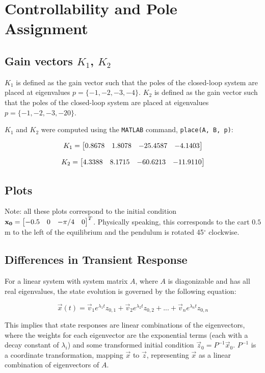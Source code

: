 \documentclass[10pt]{article}
\begin{document}
\section{Controllability and Pole Assignment}

\subsection{Gain vectors \texorpdfstring{$K_1$}{K1}, \texorpdfstring{$K_2$}{K2}}
$K_1$ is defined as the gain vector such that the poles of the closed-loop system are placed at eigenvalues $p =\{-1, -2, -3, -4\}$. $K_2$ is defined as the gain vector such that the poles of the closed-loop system are placed at eigenvalues $p =\{-1, -2, -3, -20\}$.

$K_1$ and $K_2$ were computed using the \texttt{MATLAB} command, \texttt{place(A, B, p)}:

\begin{equation*}
    K_1 = \begin{bmatrix} 0.8678 & 1.8078 & -25.4587 & -4.1403 \end{bmatrix}
\end{equation*}

\begin{equation*}
    K_2 = \begin{bmatrix} 4.3388  &  8.1715 & -60.6213 & -11.9110 \end{bmatrix}
\end{equation*}

\subsection{Plots}
Note: all these plots correspond to the initial condition $\mathbf{x_0} = \begin{bmatrix}  -0.5 & 0 & -\pi/4 & 0 \end{bmatrix}^T$. Physically speaking, this corresponds to the cart $0.5$m to the left of the equilibrium and the pendulum is rotated 45$^\circ$ clockwise.  

\subsection{Differences in Transient Response}
For a linear system with system matrix $A$, where $A$ is diagonizable and has all real eigenvalues, the state evolution is governed by the following equation:

\begin{equation} \label{eqn_state_evolution}
    \vec{x}(t) = \vec{v}_1 e^{\lambda_{1}t} z_{0,1} + \vec{v}_2 e^{\lambda_{2}t} z_{0,2} + ... + \vec{v}_n e^{\lambda_{n}t} z_{0,n}
\end{equation}

This implies that state responses are linear combinations of the eigenvectors, where the weights for each eigenvector are the exponential terms (each with a decay constant of $\lambda_i$) and some transformed initial condition $\vec{z}_0 = P^{-1}\vec{x}_0$. $P^{-1}$ is a coordinate transformation, mapping $\vec{x}$ to $\vec{z}$, representing $\vec{x}$ as a linear combination of eigenvectors of $A$.
\end{document}
